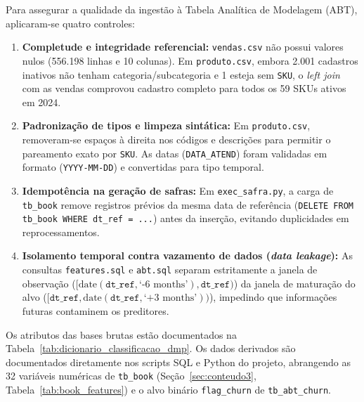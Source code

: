 \begin{sloppypar}
Para assegurar a qualidade da ingestão à Tabela Analítica de Modelagem (ABT), aplicaram-se quatro controles:
\begin{enumerate}[leftmargin=*]
    \item \textbf{Completude e integridade referencial:} \texttt{vendas.csv} não possui valores nulos (556.198 linhas e 10 colunas). Em \texttt{produto.csv}, embora 2.001 cadastros inativos não tenham categoria/subcategoria e 1 esteja sem \texttt{SKU}, o \textit{left join} com as vendas comprovou cadastro completo para todos os 59 SKUs ativos em 2024.
    \item \textbf{Padronização de tipos e limpeza sintática:} Em \texttt{produto.csv}, removeram-se espaços à direita nos códigos e descrições para permitir o pareamento exato por \texttt{SKU}. As datas (\texttt{DATA\_ATEND}) foram validadas em formato (\texttt{YYYY-MM-DD}) e convertidas para tipo temporal.
    \item \textbf{Idempotência na geração de safras:} Em \texttt{exec\_safra.py}, a carga de \texttt{tb\_book} remove registros prévios da mesma data de referência (\texttt{DELETE FROM tb\_book WHERE dt\_ref = ...}) antes da inserção, evitando duplicidades em reprocessamentos.
    \item \textbf{Isolamento temporal contra vazamento de dados (\textit{data leakage}):} As consultas \texttt{features.sql} e \texttt{abt.sql} separam estritamente a janela de observação ($\big[\text{date}(\texttt{dt\_ref}, \text{`-6 months'}), \texttt{dt\_ref}\big)$) da janela de maturação do alvo ($\big[\texttt{dt\_ref}, \text{date}(\texttt{dt\_ref}, \text{`+3 months'})\big)$), impedindo que informações futuras contaminem os preditores.
\end{enumerate}
\iffalse

Os atributos das bases brutas estão documentados na Tabela~\ref{tab:dicionario_classificacao_dmp}. Os dados derivados são documentados diretamente nos scripts SQL e Python do projeto, abrangendo as 32 variáveis numéricas de \texttt{tb\_book} (Seção~\ref{sec:conteudo3}, Tabela~\ref{tab:book_features}) e o alvo binário \texttt{flag\_churn} de \texttt{tb\_abt\_churn}.


\end{sloppypar}
